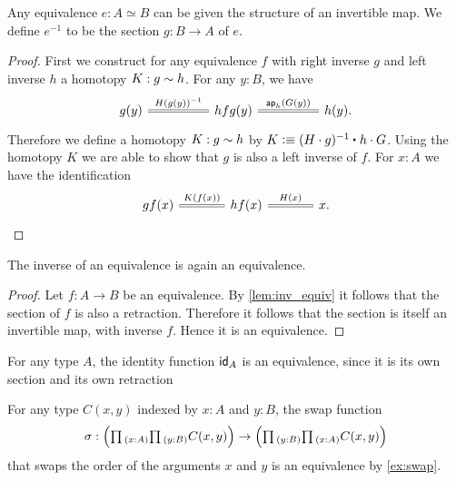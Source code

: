 \begin{lem}\label{lem:inv_equiv}
Any equivalence $e:A\simeq B$ can be given the structure of an invertible map. We define $e^{-1}$ to be the section $g:B\to A$ of $e$.
\end{lem}

\begin{proof}
First we construct for any equivalence $f$ with right inverse $g$ and left inverse $h$ a homotopy $K:g\htpy h$. For any $y:B$, we have 
\begin{equation*}
\begin{tikzcd}[column sep=huge]
g(y) \arrow[r,equals,"H(g(y))^{-1}"] & hfg(y) \arrow[r,equals,"\ap{h}{G(y)}"] & h(y).
\end{tikzcd}
\end{equation*} 
Therefore we define a homotopy $K:g\htpy h$ by $K\defeq \ct{(H\cdot g)^{-1}}{h\cdot G}$.
Using the homotopy $K$ we are able to show that $g$ is also a left inverse of $f$. For $x:A$ we have the identification
\begin{equation*}
\begin{tikzcd}[column sep=large]
gf(x) \arrow[r,equals,"K(f(x))"] & hf(x) \arrow[r,equals,"H(x)"] & x.
\end{tikzcd}\qedhere
\end{equation*}
\end{proof}

\begin{cor}
The inverse of an equivalence is again an equivalence.
\end{cor}

\begin{proof}
Let $f:A\to B$ be an equivalence. By \cref{lem:inv_equiv} it follows that the section of $f$ is also a retraction. Therefore it follows that the section is itself an invertible map, with inverse $f$. Hence it is an equivalence.
\end{proof}

\begin{rmk}\label{thm:id_equiv}
For any type $A$, the identity function $\idfunc[A]$ is an equivalence, since it is its own section and its own retraction
\end{rmk}

\begin{eg}
  For any type $C(x,y)$ indexed by $x:A$ and $y:B$, the swap function
\begin{equation*}
\sigma:\Big(\prd{x:A}\prd{y:B}C(x,y)\Big)\to\Big(\prd{y:B}\prd{x:A}C(x,y)\Big)
\end{equation*}
that swaps the order of the arguments $x$ and $y$ is an equivalence by \cref{ex:swap}.
\end{eg}

